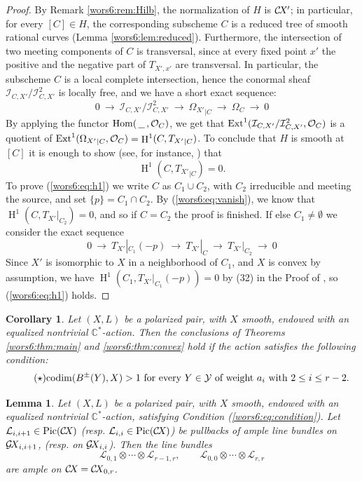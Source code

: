 \documentclass[10pt,a4paper]{article}
\numberwithin{equation}{section}
\newtheorem{lemma}[theorem]{Lemma}
\newtheorem{corollary}[theorem]{Corollary}
\theoremstyle{definition}
\theoremstyle{remark}
\DeclareMathOperator{\HH}{H}
\def\C{{\mathbb C}}
\def\cI{{\mathcal I}}
\def\cL{{\mathcal L}}
\def\cO{{\mathcal{O}}}
\def\cY{{\mathcal Y}}
\def\operatorname#1{\mathop{\rm #1}\nolimits}
\def\Ext{\operatorname{Ext}}
\def\Hom{\operatorname{Hom}}
\def\Pic{\operatorname{Pic}}
\def\Hom{\operatorname{Hom}}
\def\codim{\operatorname{codim}}
\def\GX{\mathcal{G}\!X\hspace{-0.5pt}}
\def\CX{\mathcal{C}\!X\hspace{-0.5pt}}
\newcommand{\shse}[3]{0 ~\lra ~#1~ \lra ~#2~ \lra ~#3~ \lra~ 0}
\newcommand\lra{\longrightarrow}
\begin{document}
\begin{proof}
By Remark \ref{wors6:rem:Hilb}, the normalization of $H$ is $\CX'$; in particular, for every $[C]\in H$, the corresponding subscheme $C$ is a reduced tree of smooth rational curves (Lemma \ref{wors6:lem:reduced}). Furthermore, the intersection of two meeting components of $C$ is transversal, since at every fixed point $x'$ the positive and the negative part of $T_{X',x'}$ are transversal. In particular, the subscheme $C$ is a local complete intersection, hence the conormal sheaf $\cI_{C,X'}/\cI^2_{C,X'}$ is locally free, and we have a short exact sequence:
$$
\shse{\cI_{C,X'}/\cI^2_{C,X'}}{{\Omega_{X'}}_{|C}}{\Omega_C}
$$
By applying the functor $\Hom(\,\underline{\ \ }\,,\cO_C)$, we get that $\Ext^1(\cI_{C,X'}/\cI^2_{C,X'},\cO_C)$ is a quotient of $\Ext^1({\Omega_{X'}}_{|C},\cO_C)=\HH^1(C,{T_{X'}}_{|C})$. To conclude that $H$  is smooth at $[C]$ it is enough to show (see, for instance, \cite[Theorem~I.2.8]{wors6-kollar}) that \begin{equation}\label{wors6:eq:h1}
\HH^1(C,{T_{X'}}_{|C})=0.
\end{equation}
To prove (\ref{wors6:eq:h1}) we  write $C$ as $C_1 \cup C_2$, with $C_2$ irreducible and meeting the source, and set $\{p\}=C_1\cap C_2$. By (\ref{wors6:eq:vanish}), we know that $\HH^1(C,T_{X'}|_{C_2})=0$,  and so if $C=C_2$ the proof is finished. If else $C_1 \not = \emptyset$ we consider the exact sequence
\[\shse{T_{X'}|_{C_1}(-p)}{T_{X'}|_C}{T_{X'}|_{C_2}}\]
Since $X'$ is isomorphic to $X$ in a neighborhood of $C_1$, and $X$ is convex by assumption, we  have $\HH^1(C_1,T_{X'}|_{C_1}(-p))=0$ by (32) in the Proof of \cite[Lemma~10]{wors6-FP}, so  (\ref{wors6:eq:h1}) holds.
\end{proof}

\setcounter{section}{7}\setcounter{theorem}{0}

\begin{corollary}\label{wors6:cor:main}
Let $(X,L)$ be a polarized pair, with $X$ smooth, endowed with an equalized nontrivial $\C^*$-action. Then the conclusions of Theorems \ref{wors6:thm:main} and \ref{wors6:thm:convex} hold if the action satisfies the following condition:
\begin{equation}\label{wors6:eq:condition}\tag{$\star$} 
\text{$\codim(B^\pm(Y),X)>1$ for every $Y\in \cY$ of weight $a_i$ with $2 \le i \le r-2$.}
\end{equation}
\end{corollary}

\setcounter{theorem}{3}

\begin{lemma}\label{wors6:lem:ampleg}
Let $(X,L)$ be a polarized pair, with $X$ smooth, endowed with an equalized nontrivial $\C^*$-action, satisfying Condition (\ref{wors6:eq:condition}).
Let $\cL_{i,i+1} \in \Pic(\CX)$ (resp. $\cL_{i,i} \in \Pic(\CX)$) be pullbacks of ample line bundles on $\GX_{i,i+1}$, (resp. on $\GX_{i,i}$).  Then the line bundles
\[
\cL_{0,1}\otimes\cdots\otimes\cL_{r-1,r}, \qquad \cL_{0,0}\otimes\cdots\otimes\cL_{r,r}
\]
are ample on $\CX=\CX_{0,r}$.
\end{lemma}
\end{document}
